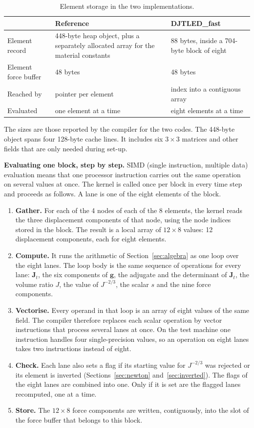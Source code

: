 \documentclass[11pt,a4paper]{article}
\newcommand{\DJF}{DJTLED\_fast}
\newcommand{\Jm}{J^{-2/3}}
\newcommand{\mat}[1]{\mathbf{#1}}
\begin{document}
\begin{table}[ht]
\centering
\small
\caption{Element storage in the two implementations.}
\label{tab:layout}
\begin{tabularx}{\linewidth}{@{}l Y Y@{}}
\toprule
 & Reference & \DJF \\
\midrule
Element record & 448-byte heap object, plus a separately allocated array for the material constants & 88 bytes, inside a 704-byte block of eight \\
Element force buffer & 48 bytes & 48 bytes \\
Reached by & pointer per element & index into a contiguous array \\
Evaluated & one element at a time & eight elements at a time \\
\bottomrule
\end{tabularx}
\end{table}

The sizes are those reported by the compiler for the two codes. The 448-byte object spans four 128-byte cache lines. It includes six $3\times3$ matrices and other fields that are only needed during set-up.

\textbf{Evaluating one block, step by step.} SIMD (single instruction, multiple data) evaluation means that one processor instruction carries out the same operation on several values at once. The kernel is called once per block in every time step and proceeds as follows. A lane is one of the eight elements of the block.
\begin{enumerate}
\item \textbf{Gather.} For each of the 4 nodes of each of the 8 elements, the kernel reads the three displacement components of that node, using the node indices stored in the block. The result is a local array of $12\times8$ values: 12 displacement components, each for eight elements.
\item \textbf{Compute.} It runs the arithmetic of Section~\ref{sec:algebra} as one loop over the eight lanes. The loop body is the same sequence of operations for every lane: $\mat{J}_t$, the six components of $\mat{g}$, the adjugate and the determinant of $\mat{J}_t$, the volume ratio $J$, the value of $\Jm$, the scalar $s$ and the nine force components.
\item \textbf{Vectorise.} Every operand in that loop is an array of eight values of the same field. The compiler therefore replaces each scalar operation by vector instructions that process several lanes at once. On the test machine one instruction handles four single-precision values, so an operation on eight lanes takes two instructions instead of eight.
\item \textbf{Check.} Each lane also sets a flag if its starting value for $\Jm$ was rejected or its element is inverted (Sections~\ref{sec:newton} and~\ref{sec:inverted}). The flags of the eight lanes are combined into one. Only if it is set are the flagged lanes recomputed, one at a time.
\item \textbf{Store.} The $12\times8$ force components are written, contiguously, into the slot of the force buffer that belongs to this block.
\end{enumerate}
\end{document}
